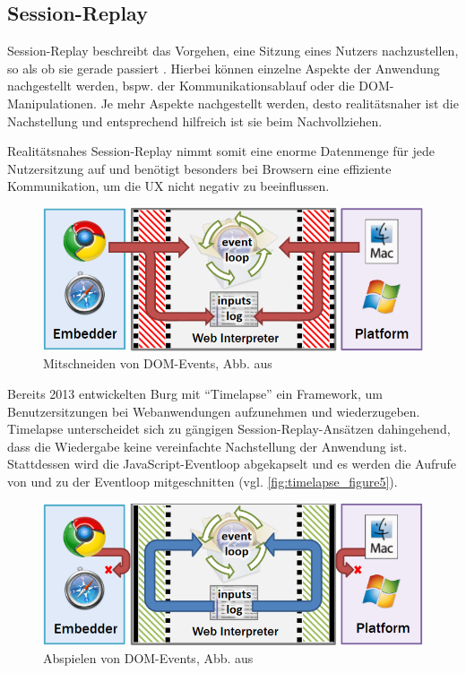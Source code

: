 \subsection{Session-Replay}

Session-Replay beschreibt das Vorgehen, eine Sitzung eines Nutzers nachzustellen, so als ob sie gerade passiert \cite{NoBoundariesExfiltrationBySessionReplayScripts}. Hierbei können einzelne Aspekte der Anwendung nachgestellt werden, bspw. der Kommunikationsablauf oder die DOM-Manipulationen. Je mehr Aspekte nachgestellt werden, desto realitätsnaher ist die Nachstellung und entsprechend hilfreich ist sie beim Nachvollziehen.

Realitätsnahes Session-Replay nimmt somit eine enorme Datenmenge für jede Nutzersitzung auf und benötigt besonders bei Browsern eine effiziente Kommunikation, um die UX nicht negativ zu beeinflussen.

\begin{figure}
\centering
\includegraphics[width=\linewidth]{img/03_methoden/timelapse_figure5.png}
\caption{Mitschneiden von DOM-Events, Abb. aus \cite{TimelapsePaper}}
\label{fig:timelapse_figure5}
\end{figure}

Bereits 2013 entwickelten Burg \etal \cite{TimelapsePaper} mit \enquote{Timelapse} ein Framework, um Benutzersitzungen bei Webanwendungen aufzunehmen und wiederzugeben. Timelapse unterscheidet sich zu gängigen Session-Replay-Ansätzen dahingehend, dass die Wiedergabe keine vereinfachte Nachstellung der Anwendung ist. Stattdessen wird die JavaScript-Eventloop abgekapselt und es werden die Aufrufe von und zu der Eventloop mitgeschnitten (vgl. \autoref{fig:timelapse_figure5}).

\begin{figure}
\centering
\includegraphics[width=\linewidth]{img/03_methoden/timelapse_figure6.png}
\caption{Abspielen von DOM-Events, Abb. aus \cite{TimelapsePaper}}
\label{fig:timelapse_figure6}
\end{figure}

